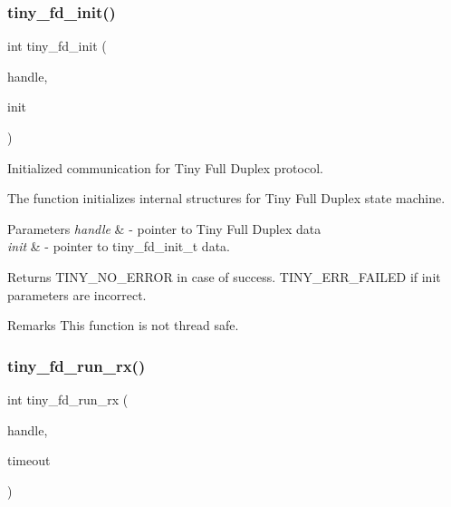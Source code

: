 \subsubsection{\texorpdfstring{tiny\+\_\+fd\+\_\+init()}{tiny\_fd\_init()}}
{\footnotesize\ttfamily int tiny\+\_\+fd\+\_\+init (\begin{DoxyParamCaption}\item[{\hyperlink{group__FULL__DUPLEX__API_ga91e6b79431fe38570fb102701ef0b7e8}{tiny\+\_\+fd\+\_\+handle\+\_\+t} $\ast$}]{handle,  }\item[{\hyperlink{group__FULL__DUPLEX__API_gad19ac27f4ba1d2b807e0a440b0c927d2}{tiny\+\_\+fd\+\_\+init\+\_\+t} $\ast$}]{init }\end{DoxyParamCaption})}



Initialized communication for Tiny Full Duplex protocol. 

The function initializes internal structures for Tiny Full Duplex state machine.


\begin{DoxyParams}{Parameters}
{\em handle} & -\/ pointer to Tiny Full Duplex data \\
\hline
{\em init} & -\/ pointer to tiny\+\_\+fd\+\_\+init\+\_\+t data. \\
\hline
\end{DoxyParams}
\begin{DoxyReturn}{Returns}
T\+I\+N\+Y\+\_\+\+N\+O\+\_\+\+E\+R\+R\+OR in case of success. T\+I\+N\+Y\+\_\+\+E\+R\+R\+\_\+\+F\+A\+I\+L\+ED if init parameters are incorrect. 
\end{DoxyReturn}
\begin{DoxyRemark}{Remarks}
This function is not thread safe. 
\end{DoxyRemark}
\mbox{\label{group__FULL__DUPLEX__API_gad31f944514aef01e27bc3ec67fdbe140}} 
\subsubsection{\texorpdfstring{tiny\+\_\+fd\+\_\+run\+\_\+rx()}{tiny\_fd\_run\_rx()}}
{\footnotesize\ttfamily int tiny\+\_\+fd\+\_\+run\+\_\+rx (\begin{DoxyParamCaption}\item[{\hyperlink{group__FULL__DUPLEX__API_ga91e6b79431fe38570fb102701ef0b7e8}{tiny\+\_\+fd\+\_\+handle\+\_\+t}}]{handle,  }\item[{uint16\+\_\+t}]{timeout }\end{DoxyParamCaption})}



